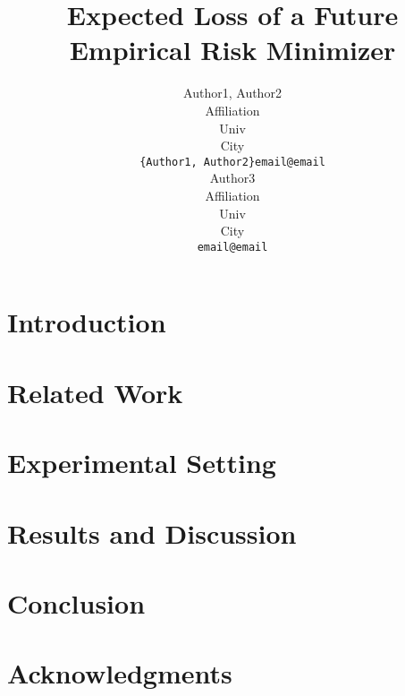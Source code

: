 \documentclass{article}
\title{Expected Loss of a Future Empirical Risk Minimizer}
\author{
  Author1, Author2 \\
  Affiliation \\
  Univ \\
  City\\
  \texttt{\{Author1, Author2\}email@email} \\
   \And
  Author3 \\
  Affiliation \\
  Univ \\
  City\\
  \texttt{email@email} \\
}
\newcommand{\version}{v1/}
\begin{document}
\maketitle


\begin{abstract}
  
\end{abstract}



\section{Introduction}
  
\section{Related Work}
  
\section{Experimental Setting}
  
\section{Results and Discussion}
  
\section{Conclusion}
  
\section*{Acknowledgments}

  
  
\end{document}
